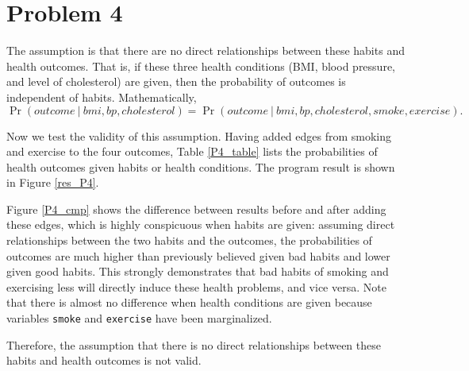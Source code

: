 \documentclass[12pt]{article}
\begin{document}
\section{Problem 4}
The assumption is that there are no direct relationships between these habits and health outcomes. That is, if these three health conditions (BMI, blood pressure, and level of cholesterol) are given, then the probability of outcomes is independent of habits. Mathematically,
$$\Pr(outcome \ |\ bmi, bp, cholesterol) = \Pr(outcome \ |\ bmi, bp, cholesterol, smoke, exercise).$$\par
Now we test the validity of this assumption. Having added edges from smoking and exercise to the four outcomes, Table \ref{P4_table} lists the probabilities of health outcomes given habits or health conditions. The program result is shown in Figure \ref{res_P4}.\par
Figure \ref{P4_cmp} shows the difference between results before and after adding these edges, which is highly conspicuous when habits are given: assuming direct relationships between the two habits and the outcomes, the probabilities of outcomes are much higher than previously believed given bad habits and lower given good habits. This strongly demonstrates that bad habits of smoking and exercising less will directly induce these health problems, and vice versa. Note that there is almost no difference when health conditions are given because variables \verb|smoke| and \verb|exercise| have been marginalized.\par
Therefore, the assumption that there is no direct relationships between these habits and health outcomes is not valid.\par
\end{document}
